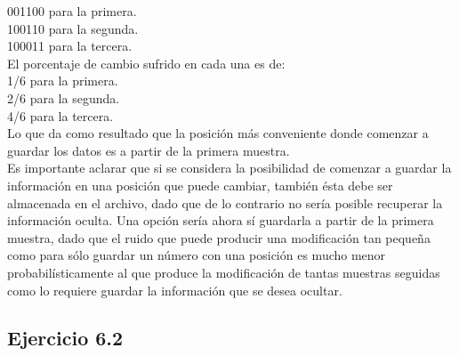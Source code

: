 \documentclass{article}
\begin{document}
001100 para la primera.\\
100110 para la segunda.\\
100011 para la tercera.\\
El porcentaje de cambio sufrido en cada una es de: \\
1/6 para la primera.\\
2/6 para la segunda.\\
4/6 para la tercera.\\
Lo que da como resultado que la posición más conveniente donde comenzar a guardar los datos es a partir de la primera muestra.\\
Es importante aclarar que si se considera la posibilidad de comenzar a guardar la información en una posición que puede cambiar, también ésta debe ser almacenada en el archivo, dado que de lo contrario no sería posible recuperar la información oculta. Una opción sería ahora sí guardarla a partir de la primera muestra, dado que el ruido que puede producir una modificación tan pequeña como para sólo guardar un número con una posición es mucho menor probabilísticamente al que produce la modificación de tantas muestras seguidas como lo requiere guardar la información que se desea ocultar.

\subsection{Ejercicio 6.2}
\end{document}
